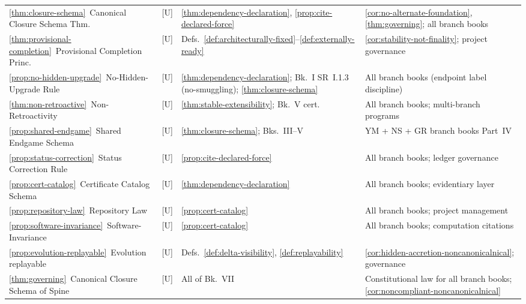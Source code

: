 \documentclass[12pt,oneside]{amsbook}
\theoremstyle{plain}
\theoremstyle{definition}
\theoremstyle{remark}
\begin{document}
\begin{tabular}{@{}p{4.4cm}p{0.8cm}p{3.0cm}p{4.8cm}@{}}
\ref{thm:closure-schema}\ Canonical Closure Schema Thm.
  & [U] & \ref{thm:dependency-declaration},
    \ref{prop:cite-declared-force}
  & \ref{cor:no-alternate-foundation}, \ref{thm:governing};
    all branch books \\

\ref{thm:provisional-completion}\ Provisional Completion Princ.
  & [U] & Defs.~\ref{def:architecturally-fixed}--\ref{def:externally-ready}
  & \ref{cor:stability-not-finality}; project governance \\

\ref{prop:no-hidden-upgrade}\ No-Hidden-Upgrade Rule
  & [U] & \ref{thm:dependency-declaration};
    Bk.~I SR~I.1.3 (no-smuggling); \ref{thm:closure-schema}
  & All branch books (endpoint label discipline) \\

\ref{thm:non-retroactive}\ Non-Retroactivity
  & [U] & \ref{thm:stable-extensibility}; Bk.~V cert.
  & All branch books; multi-branch programs \\

\ref{prop:shared-endgame}\ Shared Endgame Schema
  & [U] & \ref{thm:closure-schema}; Bks.~III--V
  & YM + NS + GR branch books Part~IV \\

\ref{prop:status-correction}\ Status Correction Rule
  & [U] & \ref{prop:cite-declared-force}
  & All branch books; ledger governance \\

\ref{prop:cert-catalog}\ Certificate Catalog Schema
  & [U] & \ref{thm:dependency-declaration}
  & All branch books; evidentiary layer \\

\ref{prop:repository-law}\ Repository Law
  & [U] & \ref{prop:cert-catalog}
  & All branch books; project management \\

\ref{prop:software-invariance}\ Software-Invariance
  & [U] & \ref{prop:cert-catalog}
  & All branch books; computation citations \\

\ref{prop:evolution-replayable}\ Evolution replayable
  & [U] & Defs.~\ref{def:delta-visibility}, \ref{def:replayability}
  & \ref{cor:hidden-accretion-noncanonicalnical}; governance \\

\ref{thm:governing}\ Canonical Closure Schema of Spine
  & [U] & All of Bk.~VII
  & Constitutional law for all branch books; \ref{cor:noncompliant-noncanonicalnical} \\
\hline
\end{tabular}
\normalsize
\renewcommand{\arraystretch}{1}
\end{document}
